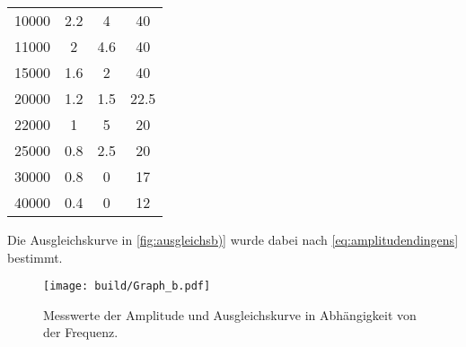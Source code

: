 \begin{table}[H]
\begin{tabular}{S S S S}
    10000       & 2.2                 & 4                   & 40         \\
    11000       & 2                   & 4.6                 & 40         \\
    15000       & 1.6                 & 2                   & 40         \\
    20000       & 1.2                 & 1.5                 & 22.5       \\
    22000       & 1                   & 5                   & 20         \\
    25000       & 0.8                 & 2.5                 & 20         \\
    30000       & 0.8                 & 0                   & 17         \\
    40000       & 0.4                 & 0                   & 12         \\
  \end{tabular}
\end{table}

Die Ausgleichskurve in \autoref{fig:ausgleichsb)} wurde dabei nach \eqref{eq:amplitudendingens} bestimmt.

\begin{figure}
  \centering
  \texttt{[image: build/Graph\_b.pdf]}
  \caption{Messwerte der Amplitude und Ausgleichskurve in Abhängigkeit von der Frequenz.}
  \label{fig:ausgleichsb)}
\end{figure}